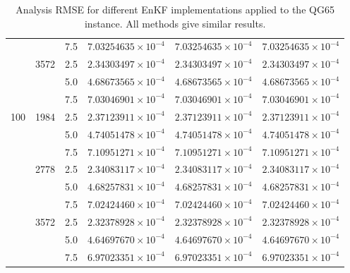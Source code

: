 \documentclass[12pt]{article}
\begin{document}
\begin{table}[H]
{\begin{tabular}{|c|c|c|c|c|c|}
& & 7.5 & $ 7.03254635 \times 10^{-4} $ & $ 7.03254635 \times 10^{-4} $ & $ 7.03254635 \times 10^{-4} $  \\ 
\cline{2-6}
&  \multirow{3}{*}{3572}  & 2.5 & $ 2.34303497 \times 10^{-4} $ & $ 2.34303497 \times 10^{-4} $ & $ 2.34303497 \times 10^{-4} $ \\
& & 5.0 & $ 4.68673565 \times 10^{-4} $ & $ 4.68673565 \times 10^{-4} $ & $ 4.68673565 \times 10^{-4} $  \\ 
& & 7.5 & $ 7.03046901 \times 10^{-4} $ & $ 7.03046901 \times 10^{-4} $ & $ 7.03046901 \times 10^{-4} $  \\ 
\cline{1-6}
\multirow{9}{*}{100} &  \multirow{3}{*}{1984}  & 2.5 & $2.37123911 \times 10^{-4}$ & $2.37123911 \times 10^{-4} $ & $ 2.37123911 \times 10^{-4} $ \\
& & 5.0 & $ 4.74051478 \times 10^{-4} $ & $ 4.74051478 \times 10^{-4} $ & $ 4.74051478 \times 10^{-4} $  \\ 
& & 7.5 & $ 7.10951271 \times 10^{-4} $ & $ 7.10951271 \times 10^{-4} $ & $ 7.10951271 \times 10^{-4} $  \\ 
\cline{2-6}
&  \multirow{3}{*}{2778}  & 2.5 & $ 2.34083117 \times 10^{-4} $ & $ 2.34083117 \times 10^{-4} $ & $ 2.34083117 \times 10^{-4} $ \\
& & 5.0 & $ 4.68257831 \times 10^{-4} $ & $ 4.68257831 \times 10^{-4} $ & $ 4.68257831 \times 10^{-4} $  \\ 
& & 7.5 & $ 7.02424460 \times 10^{-4} $ & $ 7.02424460 \times 10^{-4} $ & $ 7.02424460 \times 10^{-4} $  \\ 
\cline{2-6}
&  \multirow{3}{*}{3572}  & 2.5 & $ 2.32378928 \times 10^{-4} $ & $ 2.32378928 \times 10^{-4} $ & $ 2.32378928 \times 10^{-4} $ \\
& & 5.0 & $ 4.64697670 \times 10^{-4} $ & $ 4.64697670 \times 10^{-4} $ & $ 4.64697670 \times 10^{-4} $  \\ 
& & 7.5 & $ 6.97023351 \times 10^{-4} $ & $ 6.97023351 \times 10^{-4} $ & $ 6.97023351 \times 10^{-4} $  \\ 
\hline
\end{tabular}
}
\caption{Analysis RMSE for different EnKF implementations applied to the QG65 instance.
All methods give similar results. }
\label{Tab:QG65-Results-RMSE}
\end{table}
\end{document}
